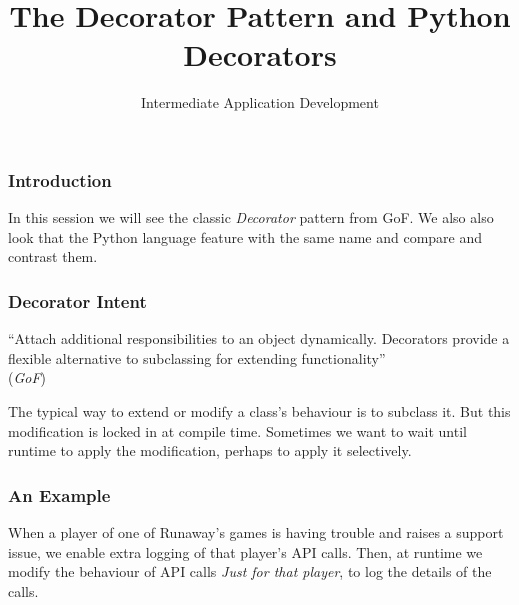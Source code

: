 \documentclass[10pt]{beamer}
\title{The Decorator Pattern and Python Decorators}
\author[IN608]{Intermediate Application Development}
\institute[Otago Polytechnic]{
  Otago Polytechnic \\
  Dunedin, New Zealand \\
  Kaiako: Tom Clark
}
\date{}
\begin{document}
\begin{frame}[plain]
  \titlepage
\end{frame}

\begin{frame}
  \frametitle{Introduction}
  
  In this session we will see the classic \emph{Decorator} pattern 
  from GoF. We also also look that the Python language feature with 
  the same name and compare and contrast them.
  
\end{frame}

\begin{frame}
  \frametitle{Decorator Intent}
  
  ``Attach additional responsibilities to an object dynamically. Decorators
  provide a flexible alternative to subclassing for extending functionality'' \\
  (\emph{GoF})
  
  \vspace{5mm}
  The typical way to extend or modify a class's behaviour is to subclass it. But this 
  modification is locked in at compile time. Sometimes we want to wait until runtime to apply 
  the modification, perhaps to apply it selectively.
  

  
\end{frame}

\begin{frame}
  \frametitle{An Example}
  
  When a player of one of Runaway's games is having trouble and raises a support issue,
  we enable extra logging of that player's API calls. Then, at runtime we modify the behaviour of
  API calls \emph{Just for that player}, to log the details of the calls.
       
\end{frame}
\end{document}
